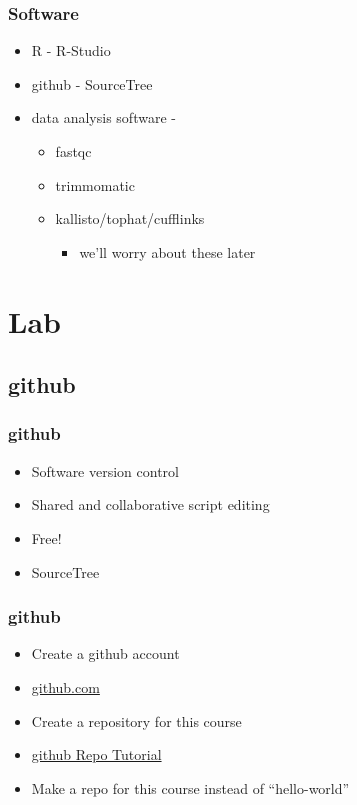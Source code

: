 \documentclass[14pt]{beamer}
\begin{document}
\begin{frame}
\frametitle{Software}
\begin{itemize}
	\item<1-> R - R-Studio
	\item<2-> github - SourceTree
	\item<3-> data analysis software - 
	\begin{itemize}
		\item fastqc
		\item trimmomatic
		\item kallisto/tophat/cufflinks
		\begin{itemize}
			\item we'll worry about these later
		\end{itemize}
	\end{itemize}
\end{itemize}
\end{frame}

\section{Lab}

\subsection{github}

\begin{frame}
\frametitle{github}
\begin{itemize}
	\item Software version control
	\item Shared and collaborative script editing
	\item Free!
	\item SourceTree
\end{itemize}
\end{frame}

\begin{frame}
\frametitle{github}
\begin{itemize}
	\item Create a github account
	\item \href{https://github.com/}{github.com}
	\item Create a repository for this course
	\item \href{https://guides.github.com/activities/hello-world/}{github Repo Tutorial}
	\item Make a repo for this course instead of ``hello-world''
\end{itemize}
\end{frame}
\end{document}
